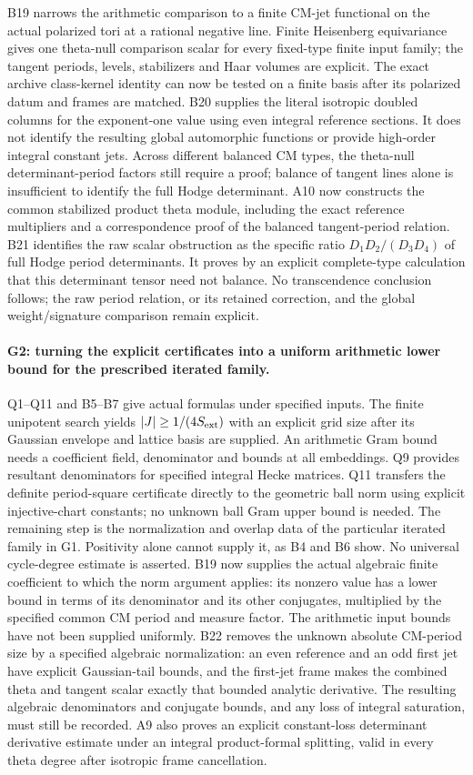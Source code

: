 B19 narrows the arithmetic comparison to a finite CM-jet
functional on the actual polarized tori at a rational negative
line. Finite Heisenberg equivariance gives one theta-null
comparison scalar for every fixed-type finite input family;
the tangent periods, levels, stabilizers and Haar volumes are
explicit. The exact archive class-kernel identity can now be
tested on a finite basis after its polarized datum and frames
are matched. B20 supplies the literal isotropic doubled columns
for the exponent-one value using even integral reference sections.
It does not identify the resulting global automorphic functions
or provide high-order integral constant jets. Across different
balanced CM types, the theta-null determinant-period factors
still require a proof; balance of tangent lines alone is
insufficient to identify the full Hodge determinant.
A10 now constructs the common stabilized product theta module,
including the exact reference multipliers and a correspondence
proof of the balanced tangent-period relation. B21 identifies
the raw scalar obstruction as the specific ratio
$D_1D_2/(D_3D_4)$ of full Hodge period determinants. It proves
by an explicit complete-type calculation that this determinant
tensor need not balance. No transcendence conclusion follows;
the raw period relation, or its retained correction, and the
global weight/signature comparison remain explicit.

\paragraph{G2: turning the explicit certificates into a uniform
arithmetic lower bound for the prescribed iterated family.}
Q1--Q11 and B5--B7 give actual formulas under specified inputs.
The finite unipotent search yields $|J|\geq1/(4S_{\rm ext})$ with
an explicit grid size after its Gaussian envelope and lattice basis
are supplied. An arithmetic Gram bound needs a coefficient field,
denominator and bounds at all embeddings. Q9 provides resultant
denominators for specified integral Hecke matrices. Q11 transfers
the definite period-square certificate directly to the geometric
ball norm using explicit injective-chart constants; no unknown
ball Gram upper bound is needed. The remaining
step is the normalization and overlap data of the particular
iterated family in G1. Positivity alone cannot supply it, as B4
and B6 show. No universal cycle-degree estimate is asserted.
B19 now supplies the actual algebraic finite coefficient to
which the norm argument applies: its nonzero value has a lower
bound in terms of its denominator and its other conjugates,
multiplied by the specified common CM period and measure factor.
The arithmetic input bounds have not been supplied uniformly.
B22 removes the unknown absolute CM-period size by a specified
algebraic normalization: an even reference and an odd first jet
have explicit Gaussian-tail bounds, and the first-jet frame
makes the combined theta and tangent scalar exactly that
bounded analytic derivative. The resulting algebraic
denominators and conjugate bounds, and any loss of integral
saturation, must still be recorded. A9 also proves an explicit
constant-loss determinant derivative estimate under an integral
product-formal splitting, valid in every theta degree after
isotropic frame cancellation.

